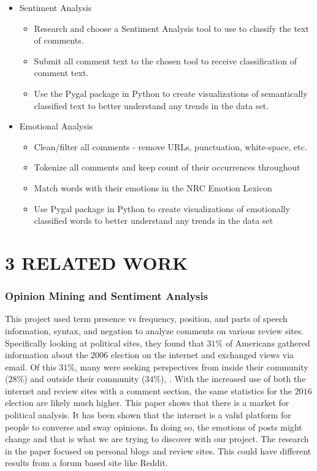 \documentclass[letterpaper]{article}
\begin{document}
\begin{itemize}
    \item Sentiment Analysis
    \begin{itemize}
        \item Research and choose a Sentiment Analysis tool to use to classify the text of comments.
        \item Submit all comment text to the chosen tool to receive classification of comment text.
        \item Use the Pygal package in Python to create visualizations of semantically classified text to better understand any trends in the data set.
    \end{itemize}
\end{itemize}

\begin{itemize}
    \item Emotional Analysis
    \begin{itemize}
        \item Clean/filter all comments - remove URLs, punctuation, white-space, etc.
        \item Tokenize all comments and keep count of their occurrences throughout
        \item Match words with their emotions in the NRC Emotion Lexicon
        \item Use Pygal package in Python to create visualizations of emotionally classified words to better understand any trends in the data set
    \end{itemize}
\end{itemize}


\section{3 RELATED WORK}

\subsubsection{Opinion Mining and Sentiment Analysis}
This project used term presence vs frequency, position, and parts of speech information, syntax, and negation to analyze comments on various review sites. Specifically looking at political sites, they found that $31\%$ of Americans gathered information about the $2006$ election on the internet and exchanged views via email. Of this $31\%$, many were seeking perspectives from inside their community ($28\%$) and outside their community ($34\%$), \cite{OpinionMining}. With the increased use of both the internet and review sites with a comment section, the same statistics for the $2016$ election are likely much higher.
This paper shows that there is a market for political analysis. It has been shown that the internet is a valid platform for people to converse and sway opinions. In doing so, the emotions of posts might change and that is what we are trying to discover with our project.
The research in the paper focused on personal blogs and review sites. This could have different results from a forum based site like Reddit.
\end{document}
